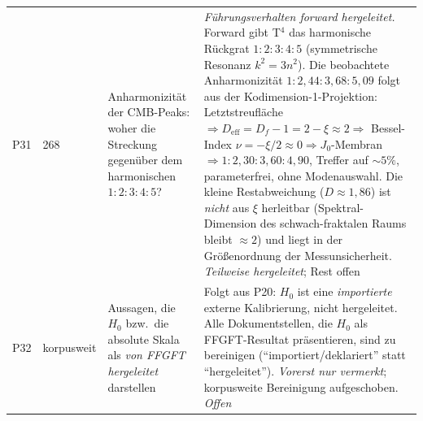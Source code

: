 {\begin{longtable}{p{0.6cm}p{2.4cm}p{5.5cm}p{5.5cm}}
P31 & 268 &
  Anharmonizität der CMB-Peaks: woher die Streckung gegenüber dem harmonischen $1:2:3:4:5$? &
  \emph{Führungsverhalten forward hergeleitet.} Forward gibt T$^4$ das harmonische Rückgrat $1:2:3:4:5$ (symmetrische Resonanz $k^2=3n^2$). Die beobachtete Anharmonizität $1:2{,}44:3{,}68:5{,}09$ folgt aus der Kodimension-1-Projektion: Letztstreufläche $\Rightarrow D_\mathrm{eff}=D_f-1=2-\xi\approx2 \Rightarrow$ Bessel-Index $\nu=-\xi/2\approx0 \Rightarrow J_0$-Membran $\Rightarrow 1:2{,}30:3{,}60:4{,}90$, Treffer auf $\sim5\%$, parameterfrei, ohne Modenauswahl. Die kleine Restabweichung ($D\approx1{,}86$) ist \emph{nicht} aus $\xi$ herleitbar (Spektral-Dimension des schwach-fraktalen Raums bleibt $\approx2$) und liegt in der Größenordnung der Messunsicherheit. \emph{Teilweise hergeleitet}; Rest offen \\[3pt]
P32 & korpusweit &
  Aussagen, die $H_0$ bzw.\ die absolute Skala als \emph{von FFGFT hergeleitet} darstellen &
  Folgt aus P20: $H_0$ ist eine \emph{importierte} externe Kalibrierung, nicht hergeleitet. Alle Dokumentstellen, die $H_0$ als FFGFT-Resultat präsentieren, sind zu bereinigen (\enquote{importiert/deklariert} statt \enquote{hergeleitet}). \emph{Vorerst nur vermerkt}; korpusweite Bereinigung aufgeschoben. \emph{Offen} \\
\end{longtable}
}
